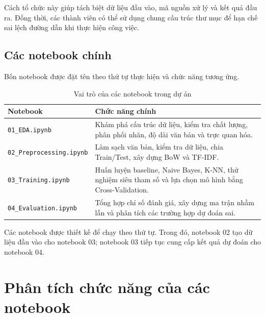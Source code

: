 Cách tổ chức này giúp tách biệt dữ liệu đầu vào, mã nguồn xử lý và kết quả đầu ra. Đồng thời, các thành viên có thể sử dụng chung cấu trúc thư mục để hạn chế sai lệch đường dẫn khi thực hiện công việc.


\subsection{Các notebook chính}

Bốn notebook được đặt tên theo thứ tự thực hiện và chức năng tương ứng.

\begin{table}[H]
\centering
\caption{Vai trò của các notebook trong dự án}
\label{tab:chuc-nang-notebook}
\renewcommand{\arraystretch}{1.15}

\begin{tabularx}{\textwidth}{|p{}|X|}
\hline
\textbf{Notebook} &
\textbf{Chức năng chính} \\
\hline

\texttt{01\_EDA.ipynb} &
Khám phá cấu trúc dữ liệu, kiểm tra chất lượng, phân phối nhãn, độ dài văn bản và trực quan hóa. \\
\hline

\texttt{02\_Preprocessing.ipynb} &
Làm sạch văn bản, kiểm tra dữ liệu, chia Train/Test, xây dựng BoW và TF-IDF. \\
\hline

\texttt{03\_Training.ipynb} &
Huấn luyện baseline, Naive Bayes, K-NN, thử nghiệm siêu tham số và lựa chọn mô hình bằng Cross-Validation. \\
\hline

\texttt{04\_Evaluation.ipynb} &
Tổng hợp chỉ số đánh giá, xây dựng ma trận nhầm lẫn và phân tích các trường hợp dự đoán sai. \\
\hline

\end{tabularx}
\end{table}

Các notebook được thiết kế để chạy theo thứ tự. Trong đó, notebook 02 tạo dữ liệu đầu vào cho notebook 03; notebook 03 tiếp tục cung cấp kết quả dự đoán cho notebook 04.



\section{Phân tích chức năng của các notebook}

